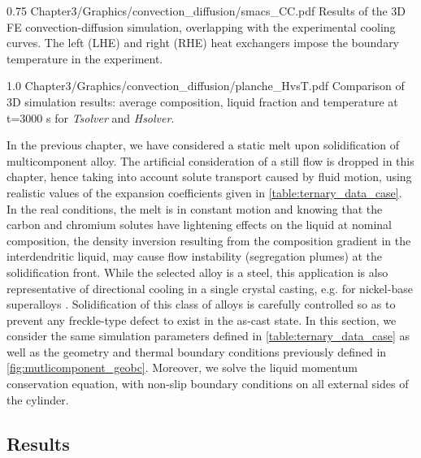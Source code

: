 \begin{figureth}
{0.75}
{Chapter3/Graphics/convection_diffusion/smacs_CC.pdf}
{Results of the 3D FE convection-diffusion simulation, overlapping with the experimental cooling curves.
The left (LHE) and right (RHE) heat exchangers impose the boundary temperature in the experiment.}
\label{fig:validation_convectiondiffusion}
\end{figureth}


\begin{figureth}
{1.0}
{Chapter3/Graphics/convection_diffusion/planche_HvsT.pdf}
{Comparison of 3D simulation results: average composition, liquid fraction and temperature at t=3000 s for \emph{Tsolver} and \emph{Hsolver}.}
\label{fig:planche_HvsT}
\end{figureth}


In the previous chapter, we have considered a static melt upon solidification of multicomponent alloy. 
The artificial consideration of a still flow is dropped in this chapter, hence taking into account solute transport 
caused by fluid motion, using realistic values of the expansion coefficients given in \cref{table:ternary_data_case}.
In the real conditions, the melt is in constant motion and knowing that the carbon and chromium solutes have lightening effects on the liquid 
at nominal composition, the density inversion resulting from the composition gradient in the interdendritic 
liquid, may cause flow instability (segregation plumes) at the solidification front. While the selected alloy 
is a steel, this application is also representative of directional cooling in a single crystal casting, e.g. 
for nickel-base superalloys \citep{beckermann_development_2000}. Solidification of this class of alloys is carefully
controlled so as to prevent any freckle-type defect to exist in the as-cast state.
In this section, we consider the same simulation parameters defined in \cref{table:ternary_data_case} as well as the geometry and thermal boundary conditions
previously defined in \cref{fig:mutlicomponent_geobc}. Moreover, we solve the liquid momentum conservation equation, with non-slip boundary conditions
on all external sides of the cylinder.

\subsection{Results}

